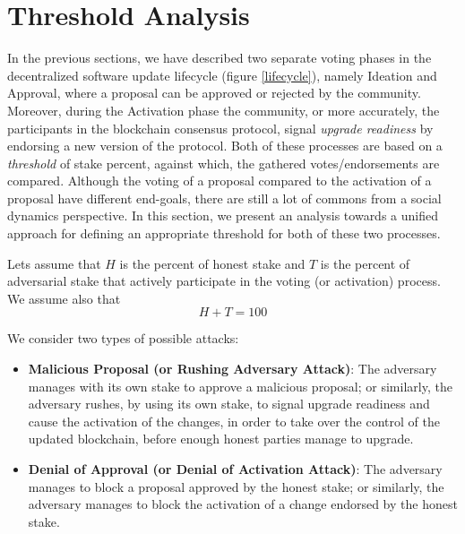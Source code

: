 \section{Threshold Analysis}

In the previous sections, we have described two separate voting phases in the 
decentralized software update lifecycle (figure \ref{lifecycle}), namely 
Ideation and Approval, where a proposal can be approved or rejected by the 
community. Moreover, during the Activation phase the community, or more 
accurately, the participants in the blockchain consensus protocol, signal 
\emph{upgrade readiness} by endorsing a new version of the protocol. Both of 
these processes are based on a \emph{threshold} of stake percent, against 
which, 
the gathered votes/endorsements are compared. Although the voting of a proposal 
compared to the activation of a proposal have different end-goals, there 
are still a lot of commons from a social dynamics perspective. In this section, 
we present an analysis towards a unified approach for defining an appropriate 
threshold for both of these two processes.

Lets assume that $H$ is the percent of honest stake and $T$ is the percent of 
adversarial stake that actively participate in the voting (or activation) 
process. We assume 
also that
\begin{equation}\label{eq:H_plus_T}
	H+T=100    
\end{equation}

We consider two types of possible attacks:
\begin{itemize}
	\item \textbf{Malicious Proposal (or Rushing Adversary Attack)}: The 
	adversary manages with its own stake to approve a malicious proposal; or 
	similarly, the adversary rushes, by using its own stake, to signal upgrade 
	readiness and cause the activation of the changes, in order to take over 
	the control of the updated blockchain, before enough honest parties manage 
	to upgrade. 
	\item \textbf{Denial of Approval (or Denial of Activation Attack)}: The 
	adversary manages to block a proposal approved by the honest stake; or 
	similarly, the adversary manages to block the activation of a 
	change endorsed by the honest stake.
\end{itemize}

